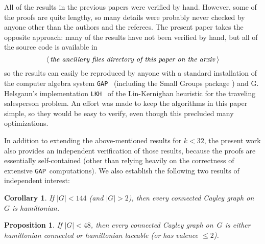\documentclass[]{amcjoucc}
\theoremstyle{plain}
\newtheorem{prop}[equation]{Proposition}
\newtheorem{cor}[equation]{Corollary}
\theoremstyle{definition}
\theoremstyle{definition}
\newcommand{\GAP}{\filename{GAP}}
\newcommand{\LKH}{\filename{LKH}}
\newcommand{\filename}[1]{\texttt{#1}}
\begin{document}
All of the results in the previous papers \cite{M2Slovenian-LowOrder, CurranMorris2-16p, GhaderpourMorris-27p, GhaderpourMorris-30p} were verified  by hand. However, some of the proofs are quite lengthy, so many details were probably never checked by anyone other than the authors and the referees. The present paper takes the opposite approach: many of the results have not been verified by hand, but all of the source code is available in 
	$$ \text{$\langle$\,\emph{the ancillary files directory of this paper on the arxiv}\,$\rangle$} $$
so the results can easily be reproduced by anyone with a standard installation of the computer algebra system \GAP\ \cite{GAP} (including the Small Groups package \cite{SmallGroups}) and G.\,Helsgaun's implementation \LKH\ \cite{LKH} of the Lin-Kernighan heuristic for the traveling salesperson problem.
An effort was made to keep the algorithms in this paper simple, so they would be easy to verify, even though this precluded many optimizations.

In addition to extending the above-mentioned results for $k < 32$, the present work also provides an independent verification of those results, because the proofs are essentially self-contained (other than relying heavily on the correctness of extensive \GAP\ computations).
We also establish the following two results of independent interest:

\begin{cor} \label{ham<144}
If\/ $|G| < 144$ \textup(and $|G| > 2$\textup), then every connected Cayley graph on~$G$ is hamiltonian.
\end{cor}

\begin{prop}  \label{hamconn<64}
If\/ $|G| < 48$, then every connected Cayley graph on~$G$ is either hamiltonian connected or hamiltonian laceable \textup(or has valence $\le 2$\textup).
\end{prop}
\end{document}
